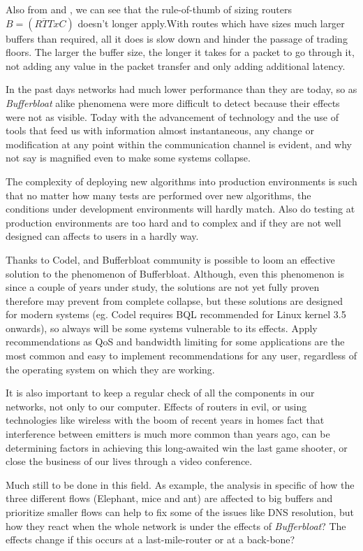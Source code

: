 Also from \cite{main:ref:1} and \cite{Vu-Brugier}, we can see that the rule-of-thumb of sizing routers $B = (\overline{RTT}xC)$ doesn't longer apply.With
routes which have sizes much larger buffers than required, all it does is slow
down and hinder the passage of trading floors. The larger the buffer size, the
longer it takes for a packet to go through it, not adding any value in the
packet transfer and only adding additional latency.

In the past days networks had much lower performance than they are today,
so as \emph{Bufferbloat} alike phenomena were more difficult to detect
because their effects were not as visible. Today with the advancement of
technology and the use of tools that feed us with information almost
instantaneous, any change or modification at any point within the
communication channel is evident, and why not say is magnified even to make
some systems collapse.

The complexity of deploying new algorithms into production environments is
such that no matter how many tests are performed over new algorithms, the
conditions under development environments will hardly match. Also do testing
at production environments are too hard and to complex\cite{Vu-Brugier} and if
they are not well designed can affects to users in a hardly way.

Thanks to Codel, and Bufferbloat community is possible to loom an effective
solution to the phenomenon of Bufferbloat. Although, even this phenomenon is
since a couple of years under study, the solutions are not yet fully proven
therefore may prevent from complete collapse, but these solutions are designed
for modern systems (eg. Codel requires BQL recommended for Linux kernel 3.5
onwards), so always will be some systems vulnerable to its effects. Apply
recommendations as QoS and bandwidth limiting for some applications are the
most common and easy to implement recommendations for any user, regardless of
the operating system on which they are working.

It is also important to keep a regular check of all the components in our
networks, not only to our computer. Effects of routers in evil, or using
technologies like wireless with the boom of recent years in homes fact that
interference between emitters is much more common than years ago, can be
determining factors in achieving this long-awaited win the last game shooter,
or close the business of our lives through a video conference.

Much still to be done in this field. As example, the analysis in specific of
how the three different flows (Elephant, mice and
ant)\cite{HaElephants}\cite{evolvshortlongflows} are affected to big buffers
and prioritize smaller flows can help to fix some of the issues like DNS
resolution, but how they react when the whole network is under the effects of
\emph{Bufferbloat}? The effects change if this occurs at a last-mile-router
or at a back-bone?

